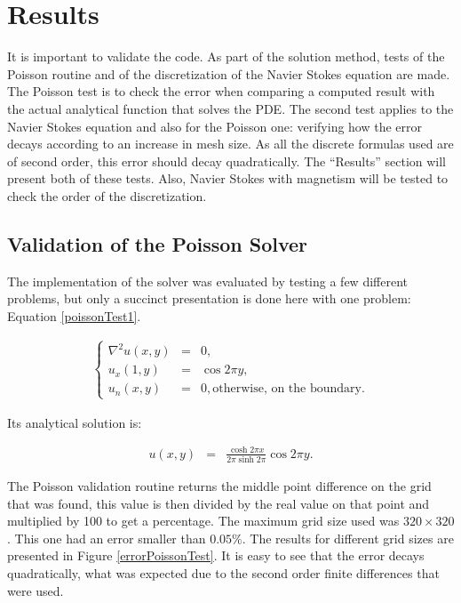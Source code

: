 \documentclass[journal]{IEEEtran}
\begin{document}
\section{Results}

It is important to validate the code. As part of the solution method, tests of the Poisson routine and of the discretization of the Navier Stokes equation are made. The Poisson test is to check the error when comparing a computed result with the actual analytical function that solves the PDE. The second test applies to the Navier Stokes equation and also for the Poisson one: verifying how the error decays according to an increase in mesh size. As all the discrete formulas used are of second order, this error should decay quadratically. The ``Results'' section will present both of these tests. Also, Navier Stokes with magnetism will be tested to check the order of the discretization.


\subsection{Validation of the Poisson Solver}

The implementation of the solver was evaluated by testing a few different problems, but only a succinct presentation is done here with one problem: Equation \ref{poissonTest1}. 

\begin{eqnarray}
\left\{\begin{array}{ccl}
\nabla^2u(x,y) & = & 0,\\
u_x(1,y) & = & \cos 2\pi y,\\
u_n(x,y) & = & 0, \textrm{otherwise, on the boundary}.
\end{array}\right. \label{poissonTest1}
\end{eqnarray}

Its analytical solution is:

\begin{eqnarray}
u(x,y) & = & \frac{\cosh 2\pi x}{2\pi \sinh 2\pi}\cos 2 \pi y .\label{solutionPoissonTest1}
\end{eqnarray}


The Poisson validation routine returns the middle point difference on the grid that was found, this value is then divided by the real value on that point and multiplied by 100 to get a percentage. The maximum grid size used was $320\times 320$. This one had an error smaller than $0.05\%$. The results for different grid sizes are presented in Figure \ref{errorPoissonTest}. It is easy to see that the error decays quadratically, what was expected due to the second order finite differences that were used.
\end{document}
